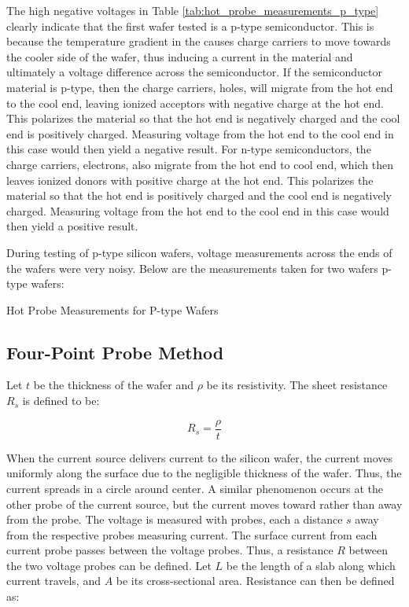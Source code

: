 \documentclass{article}
\begin{document}
	The high negative voltages in Table \ref{tab:hot_probe_measurements_p_type} clearly indicate that the first wafer tested is a p-type semiconductor. This is because the temperature gradient in the causes charge carriers to move towards the cooler side of the wafer, thus inducing a current in the material and ultimately a voltage difference across the semiconductor. If the semiconductor material is p-type, then the charge carriers, holes, will migrate from the hot end to the cool end, leaving ionized acceptors with negative charge at the hot end. This polarizes the material so that the hot end is negatively charged and the cool end is positively charged. Measuring voltage from the hot end to the cool end in this case would then yield a negative result. For n-type semiconductors, the charge carriers, electrons, also migrate from the hot end to cool end, which then leaves ionized donors with positive charge at the hot end. This polarizes the material so that the hot end is positively charged and the cool end is negatively charged. Measuring voltage from the hot end to the cool end in this case would then yield a positive result.
	
	During testing of p-type silicon wafers, voltage measurements across the ends of the wafers were very noisy. Below are the measurements taken for two wafers p-type wafers:
	
	\begin{table}[h!]
		\centering
		\caption{Hot Probe Measurements for P-type Wafers}
		\label{tab:hot_probe_measurements_n_type}
	\end{table}
	
	\subsection{Four-Point Probe Method}
Let $t$ be the thickness of the wafer and $\rho$ be its resistivity. The sheet resistance $R_s$ is defined to be:

\begin{equation}
\label{eq:rs_def}
R_s = \frac{ \rho }{ t }
\end{equation}

When the current source delivers current to the silicon wafer, the current moves uniformly along the surface due to the negligible thickness of the wafer. Thus, the current spreads in a circle around center. A similar phenomenon occurs at the other probe of the current source, but the current moves toward rather than away from the probe.
The voltage is measured with probes, each a distance $s$ away from the respective probes measuring current. The surface current from each current probe passes between the voltage probes. Thus, a resistance $R$ between the two voltage probes can be defined.
Let $L$ be the length of a slab along which current travels, and $A$ be its cross-sectional area. Resistance can then be defined as:
\end{document}
